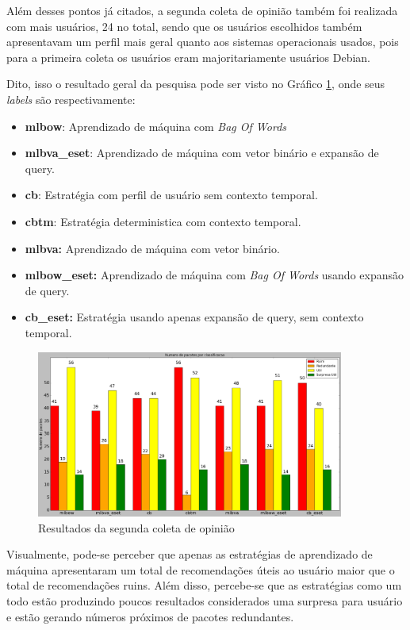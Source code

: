 Além desses pontos já citados, a segunda coleta de opinião também foi realizada com
mais usuários, 24 no total, sendo que os usuários escolhidos também apresentavam
um perfil mais geral quanto aos sistemas operacionais usados, pois para a
primeira coleta os usuários eram majoritariamente usuários Debian.

Dito, isso o resultado geral da pesquisa pode ser visto no Gráfico
\ref{fig:segundo_experimento}, onde seus \textit{labels} são respectivamente:

\begin{itemize}
    \item \textbf{mlbow}: Aprendizado de máquina com \textit{Bag Of Words}
    \item \textbf{mlbva\_eset}: Aprendizado de máquina com vetor binário e
    expansão de query.
    \item \textbf{cb}: Estratégia com perfil de usuário sem contexto temporal.
    \item \textbf{cbtm}: Estratégia deterministica com contexto temporal.
    \item \textbf{mlbva:} Aprendizado de máquina com vetor binário.
    \item \textbf{mlbow\_eset:} Aprendizado de máquina com \textit{Bag Of Words}
        usando expansão de query.
    \item \textbf{cb\_eset:} Estratégia usando apenas expansão de query, sem
        contexto temporal.
\end{itemize}

\begin{figure}[h]
  \centering
  \includegraphics[width=0.9\textwidth]{figuras/segundo_experimento.eps}
  \caption{Resultados da segunda coleta de opinião}
  \label{fig:segundo_experimento}
\end{figure}

Visualmente, pode-se perceber que apenas as estratégias de aprendizado de
máquina apresentaram um total de recomendações úteis ao usuário maior que o
total de recomendações ruins. Além disso, percebe-se que as estratégias como um
todo estão produzindo poucos resultados considerados uma surpresa para usuário e
estão gerando números próximos de pacotes redundantes.

